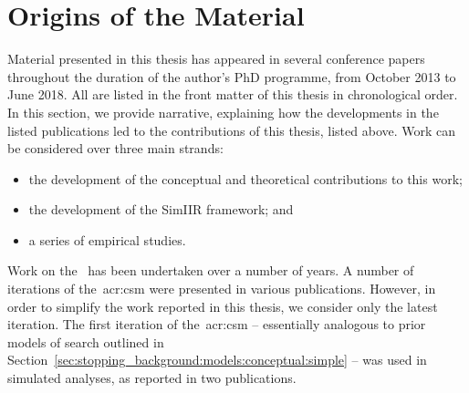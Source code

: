 
\section{Origins of the Material}
Material presented in this thesis has appeared in several conference papers throughout the duration of the author's PhD programme, from October 2013 to June 2018. All are listed in the front matter of this thesis in chronological order. In this section, we provide narrative, explaining how the developments in the listed publications led to the contributions of this thesis, listed above. Work can be considered over three main strands:

\begin{itemize}
    \item{the development of the conceptual and theoretical contributions to this work;}
    \item{the development of the SimIIR framework; and}
    \item{a series of empirical studies.}
\end{itemize}

\noindent
{}
Work on the~ has been undertaken over a number of years. A number of iterations of the~\gls{acr:csm} were presented in various publications. However, in order to simplify the work reported in this thesis, we consider only the latest iteration. The first iteration of the~\gls{acr:csm} -- essentially analogous to prior models of search outlined in Section~\ref{sec:stopping_background:models:conceptual:simple} -- was used in simulated analyses, as reported in two publications.

